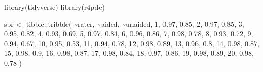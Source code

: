 \documentclass[
  letterpaper,
]{book}
\newenvironment{Shaded}{\begin{snugshade}}{\end{snugshade}}
\newcommand{\DecValTok}[1]{\textcolor[rgb]{0.68,0.00,0.00}{#1}}
\newcommand{\FloatTok}[1]{\textcolor[rgb]{0.68,0.00,0.00}{#1}}
\newcommand{\FunctionTok}[1]{\textcolor[rgb]{0.28,0.35,0.67}{#1}}
\newcommand{\NormalTok}[1]{\textcolor[rgb]{0.00,0.23,0.31}{#1}}
\newcommand{\OtherTok}[1]{\textcolor[rgb]{0.00,0.23,0.31}{#1}}
\newcommand{\SpecialCharTok}[1]{\textcolor[rgb]{0.37,0.37,0.37}{#1}}
\begin{document}
\begin{Shaded}
\begin{Highlighting}[]
\FunctionTok{library}\NormalTok{(tidyverse)}
\FunctionTok{library}\NormalTok{(r4pde)}

\NormalTok{sbr }\OtherTok{\textless{}{-}}\NormalTok{ tibble}\SpecialCharTok{::}\FunctionTok{tribble}\NormalTok{(}
  \SpecialCharTok{\textasciitilde{}}\NormalTok{rater, }\SpecialCharTok{\textasciitilde{}}\NormalTok{aided, }\SpecialCharTok{\textasciitilde{}}\NormalTok{unaided,}
      \DecValTok{1}\NormalTok{,   }\FloatTok{0.97}\NormalTok{,     }\FloatTok{0.85}\NormalTok{,}
      \DecValTok{2}\NormalTok{,   }\FloatTok{0.97}\NormalTok{,     }\FloatTok{0.85}\NormalTok{,}
      \DecValTok{3}\NormalTok{,   }\FloatTok{0.95}\NormalTok{,     }\FloatTok{0.82}\NormalTok{,}
      \DecValTok{4}\NormalTok{,   }\FloatTok{0.93}\NormalTok{,     }\FloatTok{0.69}\NormalTok{,}
      \DecValTok{5}\NormalTok{,   }\FloatTok{0.97}\NormalTok{,     }\FloatTok{0.84}\NormalTok{,}
      \DecValTok{6}\NormalTok{,   }\FloatTok{0.96}\NormalTok{,     }\FloatTok{0.86}\NormalTok{,}
      \DecValTok{7}\NormalTok{,   }\FloatTok{0.98}\NormalTok{,     }\FloatTok{0.78}\NormalTok{,}
      \DecValTok{8}\NormalTok{,   }\FloatTok{0.93}\NormalTok{,     }\FloatTok{0.72}\NormalTok{,}
      \DecValTok{9}\NormalTok{,   }\FloatTok{0.94}\NormalTok{,     }\FloatTok{0.67}\NormalTok{,}
     \DecValTok{10}\NormalTok{,   }\FloatTok{0.95}\NormalTok{,     }\FloatTok{0.53}\NormalTok{,}
     \DecValTok{11}\NormalTok{,   }\FloatTok{0.94}\NormalTok{,     }\FloatTok{0.78}\NormalTok{,}
     \DecValTok{12}\NormalTok{,   }\FloatTok{0.98}\NormalTok{,     }\FloatTok{0.89}\NormalTok{,}
     \DecValTok{13}\NormalTok{,   }\FloatTok{0.96}\NormalTok{,      }\FloatTok{0.8}\NormalTok{,}
     \DecValTok{14}\NormalTok{,   }\FloatTok{0.98}\NormalTok{,     }\FloatTok{0.87}\NormalTok{,}
     \DecValTok{15}\NormalTok{,   }\FloatTok{0.98}\NormalTok{,      }\FloatTok{0.9}\NormalTok{,}
     \DecValTok{16}\NormalTok{,   }\FloatTok{0.98}\NormalTok{,     }\FloatTok{0.87}\NormalTok{,}
     \DecValTok{17}\NormalTok{,   }\FloatTok{0.98}\NormalTok{,     }\FloatTok{0.84}\NormalTok{,}
     \DecValTok{18}\NormalTok{,   }\FloatTok{0.97}\NormalTok{,     }\FloatTok{0.86}\NormalTok{,}
     \DecValTok{19}\NormalTok{,   }\FloatTok{0.98}\NormalTok{,     }\FloatTok{0.89}\NormalTok{,}
     \DecValTok{20}\NormalTok{,   }\FloatTok{0.98}\NormalTok{,     }\FloatTok{0.78}
\NormalTok{  )}
\end{Highlighting}
\end{Shaded}
\end{document}
